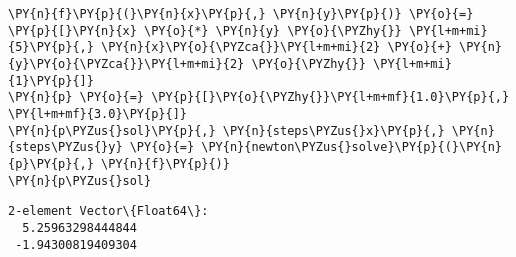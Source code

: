     \begin{tcolorbox}[breakable, size=fbox, boxrule=1pt, pad at break*=1mm,colback=cellbackground, colframe=cellborder]
\begin{Verbatim}[commandchars=\\\{\}]
\PY{n}{f}\PY{p}{(}\PY{n}{x}\PY{p}{,} \PY{n}{y}\PY{p}{)} \PY{o}{=} \PY{p}{[}\PY{n}{x} \PY{o}{*} \PY{n}{y} \PY{o}{\PYZhy{}} \PY{l+m+mi}{5}\PY{p}{,} \PY{n}{x}\PY{o}{\PYZca{}}\PY{l+m+mi}{2} \PY{o}{+} \PY{n}{y}\PY{o}{\PYZca{}}\PY{l+m+mi}{2} \PY{o}{\PYZhy{}} \PY{l+m+mi}{1}\PY{p}{]}
\PY{n}{p} \PY{o}{=} \PY{p}{[}\PY{o}{\PYZhy{}}\PY{l+m+mf}{1.0}\PY{p}{,} \PY{l+m+mf}{3.0}\PY{p}{]}
\PY{n}{p\PYZus{}sol}\PY{p}{,} \PY{n}{steps\PYZus{}x}\PY{p}{,} \PY{n}{steps\PYZus{}y} \PY{o}{=} \PY{n}{newton\PYZus{}solve}\PY{p}{(}\PY{n}{p}\PY{p}{,} \PY{n}{f}\PY{p}{)}
\PY{n}{p\PYZus{}sol}
\end{Verbatim}
\end{tcolorbox}

    
    \begin{Verbatim}[commandchars=\\\{\}]
2-element Vector\{Float64\}:
  5.25963298444844
 -1.94300819409304
    \end{Verbatim}